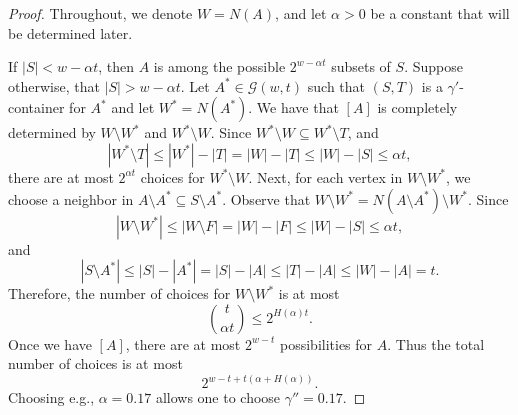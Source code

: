 \documentclass[11pt,letterpaper]{amsart}
\theoremstyle{definition}
\begin{document}
\begin{proof}
Throughout, we denote $W = N(A)$, and let $\alpha > 0$ be a constant that will be determined later. 

If $|S| < w - \alpha t$, then $A$ is among the possible $2^{w - \alpha t}$ subsets of $S$. Suppose otherwise, that $|S| > w - \alpha t$. Let $A^* \in \mathcal{G}(w,t)$ such that $(S,T)$ is a $\gamma'$-container for $A^*$ and let $W^* = N(A^*)$. We have that $[A]$ is completely determined by $W \setminus W^*$ and $W^*\setminus W$. Since $W^*\setminus W \subseteq W^*\setminus T$, and 
\[
|W^* \setminus T| \leq |W^*| - |T| = |W| - |T| \leq |W| - |S|  \leq \alpha t,
\]
there are at most $2^{\alpha t}$ choices for $W^* \setminus W$. Next, for each vertex in $W \setminus W^*$, we choose a neighbor in $A \setminus A^* \subseteq S \setminus A^*$. Observe that $W \setminus W^* = N(A \setminus A^*) \setminus W^*$. Since 
\[
|W \setminus W^*| \leq |W \setminus F| = |W| - |F| \leq |W| - |S| \leq \alpha t,
\]
and 
\[
|S \setminus A^*| \leq |S| - |A^*| = |S| - |A| \leq |T| - |A| \leq |W| - |A| =  t.
\]
Therefore, the number of choices for $W \setminus W^*$ is at most
\[
\binom{t}{\alpha t} \leq 2^{H(\alpha) t}.
\]
Once we have $[A]$, there are at most $2^{w - t}$ possibilities for $A$. Thus the total number of choices is at most
\[
2^{w - t + t(\alpha + H(\alpha))}.
\]
Choosing e.g., $\alpha = 0.17$ allows one to choose $\gamma'' = 0.17$.
\end{proof}
\end{document}
